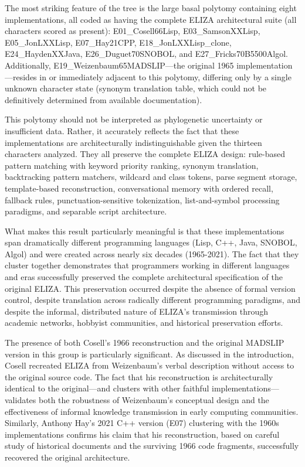 \documentclass{article}
\begin{document}
The most striking feature of the tree is the large basal polytomy containing eight implementations, all coded as having the complete ELIZA architectural suite (all characters scored as present): E01\_Cosell66Lisp, E03\_SamsonXXLisp, E05\_JonLXXLisp, E07\_Hay21CPP, E18\_JonLXXLisp\_clone, E24\_HaydenXXJava, E26\_Duguet70SNOBOL, and E27\_Fricks70B5500Algol. Additionally, E19\_Weizenbaum65MADSLIP—the original 1965 implementation—resides in or immediately adjacent to this polytomy, differing only by a single unknown character state (synonym translation table, which could not be definitively determined from available documentation).

This polytomy should not be interpreted as phylogenetic uncertainty or insufficient data. Rather, it accurately reflects the fact that these implementations are architecturally indistinguishable given the thirteen characters analyzed. They all preserve the complete ELIZA design: rule-based pattern matching with keyword priority ranking, synonym translation, backtracking pattern matchers, wildcard and class tokens, parse segment storage, template-based reconstruction, conversational memory with ordered recall, fallback rules, punctuation-sensitive tokenization, list-and-symbol processing paradigms, and separable script architecture.

What makes this result particularly meaningful is that these implementations span dramatically different programming languages (Lisp, C++, Java, SNOBOL, Algol) and were created across nearly six decades (1965-2021). The fact that they cluster together demonstrates that programmers working in different languages and eras successfully preserved the complete architectural specification of the original ELIZA. This preservation occurred despite the absence of formal version control, despite translation across radically different programming paradigms, and despite the informal, distributed nature of ELIZA's transmission through academic networks, hobbyist communities, and historical preservation efforts.

The presence of both Cosell's 1966 reconstruction and the original MADSLIP version in this group is particularly significant. As discussed in the introduction, Cosell recreated ELIZA from Weizenbaum's verbal description without access to the original source code. The fact that his reconstruction is architecturally identical to the original—and clusters with other faithful implementations—validates both the robustness of Weizenbaum's conceptual design and the effectiveness of informal knowledge transmission in early computing communities. Similarly, Anthony Hay's 2021 C++ version (E07) clustering with the 1960s implementations confirms his claim that his reconstruction, based on careful study of historical documents and the surviving 1966 code fragments, successfully recovered the original architecture.
\end{document}
